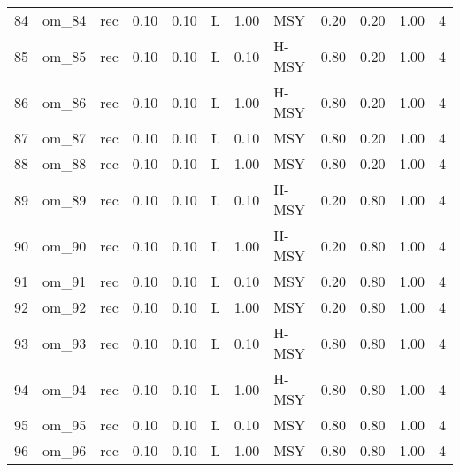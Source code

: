\begin{table}[ht]
{\begin{tabular}{rllrrlrlrrrr}
  84 & om\_84 & rec & 0.10 & 0.10 & L & 1.00 & MSY & 0.20 & 0.20 & 1.00 &   4 \\ 
  85 & om\_85 & rec & 0.10 & 0.10 & L & 0.10 & H-MSY & 0.80 & 0.20 & 1.00 &   4 \\ 
  86 & om\_86 & rec & 0.10 & 0.10 & L & 1.00 & H-MSY & 0.80 & 0.20 & 1.00 &   4 \\ 
  87 & om\_87 & rec & 0.10 & 0.10 & L & 0.10 & MSY & 0.80 & 0.20 & 1.00 &   4 \\ 
  88 & om\_88 & rec & 0.10 & 0.10 & L & 1.00 & MSY & 0.80 & 0.20 & 1.00 &   4 \\ 
  89 & om\_89 & rec & 0.10 & 0.10 & L & 0.10 & H-MSY & 0.20 & 0.80 & 1.00 &   4 \\ 
  90 & om\_90 & rec & 0.10 & 0.10 & L & 1.00 & H-MSY & 0.20 & 0.80 & 1.00 &   4 \\ 
  91 & om\_91 & rec & 0.10 & 0.10 & L & 0.10 & MSY & 0.20 & 0.80 & 1.00 &   4 \\ 
  92 & om\_92 & rec & 0.10 & 0.10 & L & 1.00 & MSY & 0.20 & 0.80 & 1.00 &   4 \\ 
  93 & om\_93 & rec & 0.10 & 0.10 & L & 0.10 & H-MSY & 0.80 & 0.80 & 1.00 &   4 \\ 
  94 & om\_94 & rec & 0.10 & 0.10 & L & 1.00 & H-MSY & 0.80 & 0.80 & 1.00 &   4 \\ 
  95 & om\_95 & rec & 0.10 & 0.10 & L & 0.10 & MSY & 0.80 & 0.80 & 1.00 &   4 \\ 
  96 & om\_96 & rec & 0.10 & 0.10 & L & 1.00 & MSY & 0.80 & 0.80 & 1.00 &   4 \\ 
   \hline
\end{tabular}
}
\end{table}
